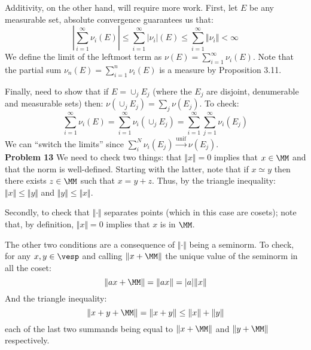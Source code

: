     Additivity, on the other hand, will require more work. First, let $E$ be any measurable set, absolute convergence guarantees us that:
    $$\left|\sum_{i=1}^\infty \nu_i(E)\right|\leq \sum_{i=1}^\infty |\nu_i|(E)\leq \sum_{i=1}^\infty \Vert \nu_i \Vert<\infty$$
    We define the limit of the leftmost term as $\nu(E) = \sum_{i=1}^\infty \nu_i(E)$. Note that the partial sum $\nu_n(E) = \sum_{i=1}^n \nu_i(E)$ is a measure by Proposition 3.11. 

    Finally, need to show that if $E=\cup_j E_j$ (where the $E_j$ are disjoint, denumerable and measurable sets) then: $\nu(\cup_j E_j)= \sum_j \nu(E_j)$. To check: 
    $$\sum_{i=1}^\infty \nu_i(E)=\sum_{i=1}^\infty \nu_i(\cup_j E_j)=\sum_{i=1}^\infty \sum_{j=1}^\infty \nu_i(E_j)$$
    We can ``switch the limits'' since $\sum_i^N \nu_i(E_j) \xrightarrow{\text{unif}} \nu(E_j) $.\\[1em]

\noindent\textbf{Problem 13} We  need to check two things: that $\Vert x\Vert=0$ implies that $x\in \MM$ and that the norm is well-defined. Starting with the latter, note that if $x\simeq y$ then there exists $z\in \MM$ such that $x=y+z$. Thus, by the triangle inequality: $\Vert x\Vert \leq \Vert y\Vert$ and $\Vert y\Vert \leq \Vert x\Vert$.

        Secondly, to check that $\Vert \cdot \Vert$ separates points (which in this case are cosets); note that, by definition,  $\Vert x\Vert=0$ implies that $x$ is in $\MM$.
        
        The other two conditions are a consequence of $\Vert \cdot \Vert$ being a seminorm. To check, for any $x,y\in \vesp$ and calling $\Vert x+\MM \Vert$ the unique value of the seminorm in all the coset:
        $$\Vert ax+\MM\Vert = \Vert ax\Vert = |a|\Vert x\Vert$$
        And the triangle inequality:
        $$\Vert x+y +\MM \Vert = \Vert x+y \Vert \leq \Vert x\Vert + \Vert y \Vert$$
        each of the last two summands being equal to $\Vert x+\MM\Vert$ and $\Vert y+\MM\Vert$ respectively.\\[1em]
